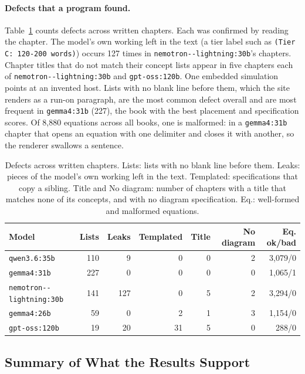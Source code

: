 \documentclass[11pt]{article}
\newcommand{\mdl}[1]{\texttt{#1}}
\newcommand{\Gthirtyone}{\mdl{gemma4:31b}}
\newcommand{\Qsix}{\mdl{qwen3.6:35b}}
\newcommand{\Gtwentysix}{\mdl{gemma4:26b}}
\newcommand{\Nemo}{\mdl{nemotron-\allowbreak 3.5-\allowbreak lightning:30b}}
\newcommand{\Gptoss}{\mdl{gpt-oss:120b}}
\begin{document}
\paragraph{Defects that a program found.}
Table~\ref{tab:defects} counts defects across written chapters. Each was confirmed by reading the chapter. The model's own working left in the text (a tier label such as \texttt{(Tier C: 120-200 words)}) occurs 127 times in \Nemo's chapters. Chapter titles that do not match their concept lists appear in five chapters each of \Nemo{} and \Gptoss. One embedded simulation points at an invented host. Lists with no blank line before them, which the site renders as a run-on paragraph, are the most common defect overall and are most frequent in \Gthirtyone{} (227), the book with the best placement and specification scores. Of 8,880 equations across all books, one is malformed: in a \Gthirtyone{} chapter that opens an equation with one delimiter and closes it with another, so the renderer swallows a sentence.

\begin{table}[htbp]
\centering
\small
\begin{tabular}{@{}lrrrrrr@{}}
\toprule
\textbf{Model} & \textbf{Lists} & \textbf{Leaks} & \textbf{Templated} & \textbf{Title} & \textbf{No diagram} & \textbf{Eq. ok/bad} \\
\midrule
\Qsix & 110 & 9 & 0 & 0 & 2 & 3,079/0 \\
\Gthirtyone & 227 & 0 & 0 & 0 & 0 & 1,065/1 \\
\Nemo & 141 & 127 & 0 & 5 & 2 & 3,294/0 \\
\Gtwentysix & 59 & 0 & 2 & 1 & 3 & 1,154/0 \\
\Gptoss & 19 & 20 & 31 & 5 & 0 & 288/0 \\
\bottomrule
\end{tabular}
\caption{Defects across written chapters. Lists: lists with no blank line before them. Leaks: pieces of the model's own working left in the text. Templated: specifications that copy a sibling. Title and No diagram: number of chapters with a title that matches none of its concepts, and with no diagram specification. Eq.: well-formed and malformed equations.}
\label{tab:defects}
\end{table}

\subsection{Summary of What the Results Support}
\end{document}
